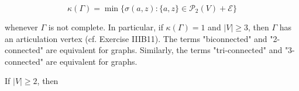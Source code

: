 $$\kappa(\Gamma) = \min\{\sigma(a, z): \{a, z\} \in \mathcal{P}_2(V) + \mathcal{E}\}$$

whenever $\Gamma$ is not complete. In particular, if $\kappa(\Gamma) = 1$ and $|V| \geq 3$, then $\Gamma$ has an articulation vertex (cf. Exercise IIIB11). The terms "biconnected" and "2-connected" are equivalent for graphs. Similarly, the terms "tri-connected" and "3-connected" are equivalent for graphs.

If $|V| \geq 2$, then
